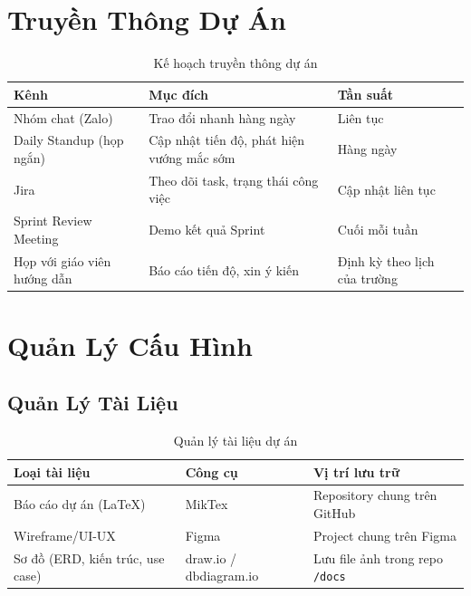 \section{Truyền Thông Dự Án}

\begin{table}[H]
  \centering
  \begin{tabularx}{\textwidth}{|l|X|l|}
    \hline
    \textbf{Kênh} & \textbf{Mục đích} & \textbf{Tần suất} \\
    \hline
    Nhóm chat (Zalo) & Trao đổi nhanh hàng ngày & Liên tục \\ \hline
    Daily Standup (họp ngắn) & Cập nhật tiến độ, phát hiện vướng mắc sớm & Hàng ngày \\ \hline
    Jira & Theo dõi task, trạng thái công việc & Cập nhật liên tục \\ \hline
    Sprint Review Meeting & Demo kết quả Sprint & Cuối mỗi tuần \\ \hline
    Họp với giáo viên hướng dẫn & Báo cáo tiến độ, xin ý kiến & Định kỳ theo lịch của trường \\
    \hline
  \end{tabularx}
  \caption{Kế hoạch truyền thông dự án}
  \label{tab:communication}
\end{table}

\section{Quản Lý Cấu Hình}

\subsection{Quản Lý Tài Liệu}

\begin{table}[H]
  \centering
  \begin{tabularx}{\textwidth}{|l|l|X|}
    \hline
    \textbf{Loại tài liệu} & \textbf{Công cụ} & \textbf{Vị trí lưu trữ} \\
    \hline
    Báo cáo dự án (LaTeX) & MikTex & Repository chung trên GitHub \\ \hline
    Wireframe/UI-UX & Figma & Project chung trên Figma \\ \hline
    Sơ đồ (ERD, kiến trúc, use case) & draw.io / dbdiagram.io & Lưu file ảnh trong repo \texttt{/docs} \\
    \hline
  \end{tabularx}
  \caption{Quản lý tài liệu dự án}
  \label{tab:doc_management}
\end{table}

